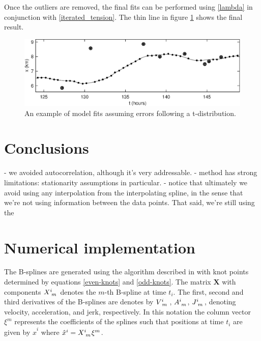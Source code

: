 \documentclass[10pt,journal]{IEEEtran}
\begin{document}
Once the outliers are removed, the final fits can be performed using \ref{lambda} in conjunction with \ref{iterated_tension}. The thin line in figure \ref{tdistributionfit} shows the final result.

\begin{figure}[t]
  \centerline{\includegraphics[width=39pc,angle=0]{tdistributionfit}}
  
  \caption{An example of model fits assuming errors following a t-distribution.}
  \label{tdistributionfit}
\end{figure}


\section{Conclusions}

- we avoided autocorrelation, although it's very addressable.
- method has strong limitations: stationarity assumptions in particular.
- notice that ultimately we avoid using any interpolation from the interpolating spline, in the sense that we're not using information between the data points. That said, we're still using the 

%
\appendices
%

\section{Numerical implementation}
\label{sec:numerical_implementation}

The B-splines are generated using the algorithm described in \cite{deboor1978-book} with knot points determined by equations \ref{even-knots} and \ref{odd-knots}. The matrix $\mathbf{X}$ with components $X\indices{^i_m}$ denotes the $m$-th B-spline at time $t_i$. The first, second and third derivatives of the B-splines are denotes by $V\indices{^i_m}$, $A\indices{^i_m}$, $J\indices{^i_m}$, denoting velocity, acceleration, and jerk, respectively. In this notation the column vector $\xi^m$ represents the coefficients of the splines such that positions at time $t_i$ are given by $\hat{x}^i$ where $\hat{x}^i =  X\indices{^i_m} \xi^m$.
\end{document}
